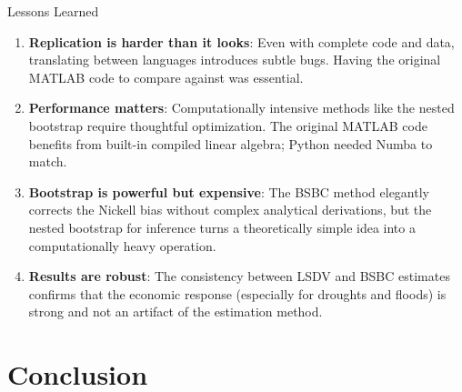 \documentclass[10pt, aspectratio=169]{beamer}
\begin{document}
\begin{frame}{Lessons Learned}
\begin{enumerate}
    \item \textbf{Replication is harder than it looks}: Even with complete code and data, translating between languages introduces subtle bugs. Having the original MATLAB code to compare against was essential.
    
    \vspace{0.3em}
    \item \textbf{Performance matters}: Computationally intensive methods like the nested bootstrap require thoughtful optimization. The original MATLAB code benefits from built-in compiled linear algebra; Python needed Numba to match.
    
    \vspace{0.3em}
    \item \textbf{Bootstrap is powerful but expensive}: The BSBC method elegantly corrects the Nickell bias without complex analytical derivations, but the nested bootstrap for inference turns a theoretically simple idea into a computationally heavy operation.
    
    \vspace{0.3em}
    \item \textbf{Results are robust}: The consistency between LSDV and BSBC estimates confirms that the economic response (especially for droughts and floods) is strong and not an artifact of the estimation method.
\end{enumerate}
\end{frame}

\section{Conclusion}
\end{document}

